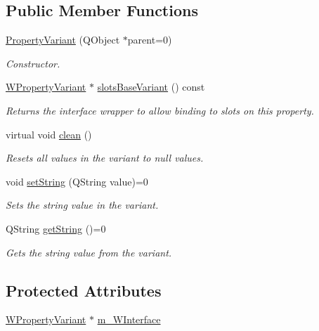 \subsection*{Public Member Functions}
\begin{DoxyCompactItemize}
\item 
\hyperlink{class_property_variant_aa78ec5c7213ade15fbfac55f374af6f7}{Property\-Variant} (Q\-Object $\ast$parent=0)
\begin{DoxyCompactList}\small\item\em Constructor. \end{DoxyCompactList}\item 
\hyperlink{class_w_property_variant}{W\-Property\-Variant} $\ast$ \hyperlink{class_property_variant_a3add7a66fd48297fd8f71180ad8d40b4}{slots\-Base\-Variant} () const 
\begin{DoxyCompactList}\small\item\em Returns the interface wrapper to allow binding to slots on this property. \end{DoxyCompactList}\item 
\hypertarget{class_property_variant_a51cc58cfcfd95cf4a89ab799c2620e5c}{virtual void \hyperlink{class_property_variant_a51cc58cfcfd95cf4a89ab799c2620e5c}{clean} ()}\label{class_property_variant_a51cc58cfcfd95cf4a89ab799c2620e5c}

\begin{DoxyCompactList}\small\item\em Resets all values in the variant to null values. \end{DoxyCompactList}\item 
void \hyperlink{class_property_variant_a9930eec4da97a6efca8246a23e016b46}{set\-String} (Q\-String value)=0
\begin{DoxyCompactList}\small\item\em Sets the string value in the variant. \end{DoxyCompactList}\item 
Q\-String \hyperlink{class_property_variant_a888bfdfc985f6cc181658eaf0ee24381}{get\-String} ()=0
\begin{DoxyCompactList}\small\item\em Gets the string value from the variant. \end{DoxyCompactList}\end{DoxyCompactItemize}
\subsection*{Protected Attributes}
\begin{DoxyCompactItemize}
\item 
\hyperlink{class_w_property_variant}{W\-Property\-Variant} $\ast$ \hyperlink{class_property_variant_a1e4df466c54f47349130ca4c3cb0bf93}{m\-\_\-\-W\-Interface}
\end{DoxyCompactItemize}


